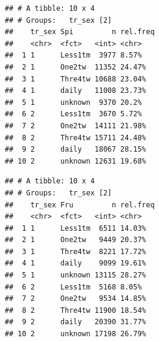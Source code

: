 \documentclass[]{article}
\newenvironment{Shaded}{\begin{snugshade}}{\end{snugshade}}
\newcommand{\DataTypeTok}[1]{\textcolor[rgb]{0.13,0.29,0.53}{#1}}
\newcommand{\DecValTok}[1]{\textcolor[rgb]{0.00,0.00,0.81}{#1}}
\newcommand{\KeywordTok}[1]{\textcolor[rgb]{0.13,0.29,0.53}{\textbf{#1}}}
\newcommand{\NormalTok}[1]{#1}
\newcommand{\OperatorTok}[1]{\textcolor[rgb]{0.81,0.36,0.00}{\textbf{#1}}}
\newcommand{\OtherTok}[1]{\textcolor[rgb]{0.56,0.35,0.01}{#1}}
\newcommand{\StringTok}[1]{\textcolor[rgb]{0.31,0.60,0.02}{#1}}
\begin{document}
\begin{verbatim}
## # A tibble: 10 x 4
## # Groups:   tr_sex [2]
##    tr_sex Spi         n rel.freq
##    <chr>  <fct>   <int> <chr>   
##  1 1      Less1tm  3977 8.57%   
##  2 1      One2tw  11352 24.47%  
##  3 1      Thre4tw 10688 23.04%  
##  4 1      daily   11008 23.73%  
##  5 1      unknown  9370 20.2%   
##  6 2      Less1tm  3670 5.72%   
##  7 2      One2tw  14111 21.98%  
##  8 2      Thre4tw 15711 24.48%  
##  9 2      daily   18067 28.15%  
## 10 2      unknown 12631 19.68%
\end{verbatim}

\begin{Shaded}
\end{Shaded}

\begin{verbatim}
## # A tibble: 10 x 4
## # Groups:   tr_sex [2]
##    tr_sex Fru         n rel.freq
##    <chr>  <fct>   <int> <chr>   
##  1 1      Less1tm  6511 14.03%  
##  2 1      One2tw   9449 20.37%  
##  3 1      Thre4tw  8221 17.72%  
##  4 1      daily    9099 19.61%  
##  5 1      unknown 13115 28.27%  
##  6 2      Less1tm  5168 8.05%   
##  7 2      One2tw   9534 14.85%  
##  8 2      Thre4tw 11900 18.54%  
##  9 2      daily   20390 31.77%  
## 10 2      unknown 17198 26.79%
\end{verbatim}

\begin{Shaded}
\end{Shaded}
\end{document}

